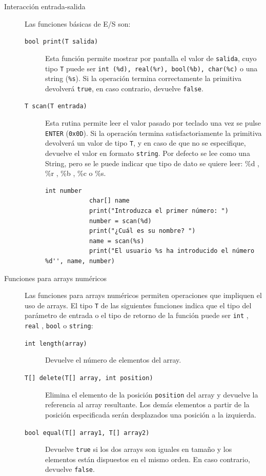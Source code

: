 \documentclass[11pt, english]{article}
\begin{document}
	\begin{description}
		\item [Interacción entrada-salida] Las funciones básicas de E/S son:
		\begin{description}
			
			\item[\texttt{bool print(T salida)}] Esta función permite mostrar por pantalla el valor de \texttt{salida}, cuyo tipo \texttt{T} puede ser \texttt{int (\%d), real(\%r), bool(\%b), char(\%c)} o una string (\texttt{\%s}). Si la operación termina correctamente la primitiva devolverá \texttt{true}, en caso contrario, devuelve \texttt{false}.
			\item[\texttt{T scan(T entrada)}] Esta rutina permite leer el valor pasado por teclado una vez se pulse \texttt{ENTER} (\texttt{0x0D}). Si la operación termina satisfactoriamente la primitiva devolverá un valor de tipo  \texttt{T}, y en caso de que no se especifique, devuelve el valor en formato \texttt{string}. Por defecto se lee como una String, pero se le puede indicar que tipo de dato se quiere leer: \%d , \%r , \%b , \%c o \%s.
			
			\begin{lstlisting}[caption=Ejemplo de uso de la función \texttt{print()} y \texttt{scan()}]
			int number
			char[] name
			print("Introduzca el primer número: ")
			number = scan(%d)
			print("¿Cuál es su nombre? ")
			name = scan(%s)
			print("El usuario %s ha introducido el número %d'', name, number)
			\end{lstlisting}
		\end{description}
		
		
		\item [Funciones para arrays numéricos] Las funciones para arrays numéricos permiten operaciones que impliquen el uso de arrays. El tipo \texttt{T} de las siguientes funciones indica que el tipo del parámetro de entrada o el tipo de retorno de la función puede ser \texttt{int} ,  \texttt{real} ,  \texttt{bool} o \texttt{string}:
		
		\begin{description}
			\item [\texttt{int length(array)}] Devuelve el número de elementos del array.
			\item [\texttt{T[] delete(T[] array, int position)}] Elimina el elemento de la posición \texttt{position} del array y devuelve la referencia al array resultante. Los demás elementos a partir de la posición especificada serán desplazados una posición a la izquierda.
			\item [\texttt{bool equal(T[] array1, T[] array2)}] Devuelve \texttt{true} si los dos arrays son iguales en tamaño y los elementos están dispuestos en el mismo orden. En caso contrario, devuelve \texttt{false}.
		\end{description}
	\end{description}
	
\end{document}
